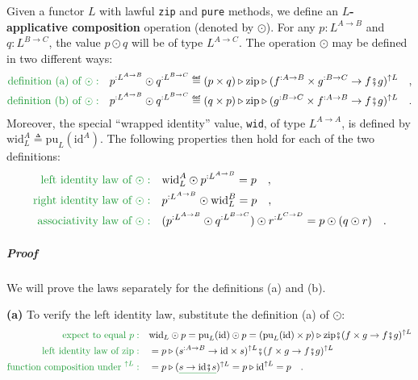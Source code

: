 Given a functor $L$ with lawful \lstinline!zip! and \lstinline!pure!
methods, we define an \textbf{$L$-applicative
composition} operation (denoted by $\odot$). For any $p:L^{A\rightarrow B}$
and $q:L^{B\rightarrow C}$, the value $p\odot q$ will be of type
$L^{A\rightarrow C}$. The operation $\odot$ may be defined in two
different ways:
\begin{align*}
{\color{greenunder}\text{definition (a) of }\odot:}\quad & p^{:L^{A\rightarrow B}}\odot q^{:L^{B\rightarrow C}}\triangleq(p\times q)\triangleright\text{zip}\triangleright(f^{:A\rightarrow B}\times g^{:B\rightarrow C}\rightarrow f\bef g)^{\uparrow L}\quad,\\
{\color{greenunder}\text{definition (b) of }\odot:}\quad & p^{:L^{A\rightarrow B}}\odot q^{:L^{B\rightarrow C}}\triangleq(q\times p)\triangleright\text{zip}\triangleright(g^{:B\rightarrow C}\times f^{:A\rightarrow B}\rightarrow f\bef g)^{\uparrow L}\quad.
\end{align*}
Moreover, the special \textsf{``}wrapped identity\textsf{''} value, \lstinline!wid!,
of type $L^{A\rightarrow A}$, is defined by $\text{wid}_{L}^{A}\triangleq\text{pu}_{L}(\text{id}^{A})$.
The following properties then hold for each of the two definitions:
\begin{align*}
{\color{greenunder}\text{left identity law of }\odot:}\quad & \text{wid}_{L}^{A}\odot p^{:L^{A\rightarrow B}}=p\quad,\\
{\color{greenunder}\text{right identity law of }\odot:}\quad & p^{:L^{A\rightarrow B}}\odot\text{wid}_{L}^{B}=p\quad,\\
{\color{greenunder}\text{associativity law of }\odot:}\quad & (p^{:L^{A\rightarrow B}}\odot q^{:L^{B\rightarrow C}})\odot r^{:L^{C\rightarrow D}}=p\odot(q\odot r)\quad.
\end{align*}


\subparagraph{Proof}

We will prove the laws separately for the definitions (a) and (b).

\textbf{(a)} To verify the left identity law, substitute the definition
(a) of $\odot$:
\begin{align*}
{\color{greenunder}\text{expect to equal }p:}\quad & \text{wid}_{L}\odot p=\text{pu}_{L}(\text{id})\odot p=(\text{pu}_{L}(\text{id})\times p)\triangleright\text{zip}\bef(f\times g\rightarrow f\bef g)^{\uparrow L}\\
{\color{greenunder}\text{left identity law of }\text{zip}:}\quad & =p\triangleright(s^{:A\rightarrow B}\rightarrow\text{id}\times s)^{\uparrow L}\bef(f\times g\rightarrow f\bef g)^{\uparrow L}\\
{\color{greenunder}\text{function composition under }^{\uparrow L}:}\quad & =p\triangleright(\gunderline{s\rightarrow\text{id}\bef s})^{\uparrow L}=p\triangleright\text{id}^{\uparrow L}=p\quad.
\end{align*}

